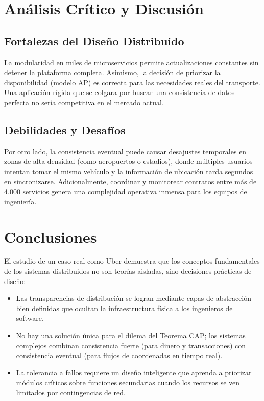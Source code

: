 \documentclass[12pt,a4paper]{article}
\begin{document}
\section{Análisis Crítico y Discusión}

\subsection{Fortalezas del Diseño Distribuido}
La modularidad en miles de microservicios permite actualizaciones constantes sin detener la plataforma completa. Asimismo, la decisión de priorizar la disponibilidad (modelo AP) es correcta para las necesidades reales del transporte. Una aplicación rígida que se colgara por buscar una consistencia de datos perfecta no sería competitiva en el mercado actual.

\subsection{Debilidades y Desafíos}
Por otro lado, la consistencia eventual puede causar desajustes temporales en zonas de alta densidad (como aeropuertos o estadios), donde múltiples usuarios intentan tomar el mismo vehículo y la información de ubicación tarda segundos en sincronizarse. Adicionalmente, coordinar y monitorear contratos entre más de 4.000 servicios genera una complejidad operativa inmensa para los equipos de ingeniería.

\section{Conclusiones}

El estudio de un caso real como Uber demuestra que los conceptos fundamentales de los sistemas distribuidos no son teorías aisladas, sino decisiones prácticas de diseño:

\begin{itemize}
  \item Las transparencias de distribución se logran mediante capas de abstracción bien definidas que ocultan la infraestructura física a los ingenieros de software.
  \item No hay una solución única para el dilema del Teorema CAP; los sistemas complejos combinan consistencia fuerte (para dinero y transacciones) con consistencia eventual (para flujos de coordenadas en tiempo real).
  \item La tolerancia a fallos requiere un diseño inteligente que aprenda a priorizar módulos críticos sobre funciones secundarias cuando los recursos se ven limitados por contingencias de red.
\end{itemize}
\end{document}
